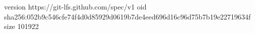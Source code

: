version https://git-lfs.github.com/spec/v1
oid sha256:052b9c546cfe74f4d0d85929d0619b7de4eed696d16c96d75b7b19e22719634f
size 101922
